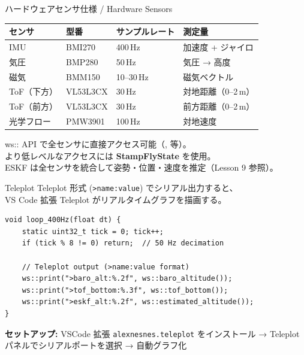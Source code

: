 
\begin{frame}{ハードウェアセンサ仕様 / Hardware Sensors}
  \vspace{0.3em}
  \centering
  {\small
  \begin{tabular}{llll}
    \hline
    \textbf{センサ} & \textbf{型番} & \textbf{サンプルレート} & \textbf{測定量} \\
    \hline
    IMU        & BMI270  & 400\,Hz  & 加速度 + ジャイロ \\
    気圧       & BMP280  & 50\,Hz   & 気圧 → 高度 \\
    磁気       & BMM150  & 10--30\,Hz & 磁気ベクトル \\
    ToF（下方） & VL53L3CX & 30\,Hz  & 対地距離（0--2\,m） \\
    ToF（前方） & VL53L3CX & 30\,Hz  & 前方距離（0--2\,m） \\
    光学フロー  & PMW3901 & 100\,Hz  & 対地速度 \\
    \hline
  \end{tabular}
  }

  \vspace{1em}

  {\footnotesize
    ws:: API で全センサに直接アクセス可能（,  等）。\\
    より低レベルなアクセスには \textbf{StampFlyState} を使用。\\
    ESKF は全センサを統合して姿勢・位置・速度を推定（Lesson 9 参照）。
  }
\end{frame}

\begin{frame}[fragile]{Teleplot}
  \vspace{0.3em}
  {\small Teleplot 形式 (\texttt{>name:value}) でシリアル出力すると、\\
  VS Code 拡張 Teleplot がリアルタイムグラフを描画する。}

  \vspace{0.3em}

  \begin{lstlisting}[style=sfcpp, basicstyle=\ttfamily\scriptsize]
void loop_400Hz(float dt) {
    static uint32_t tick = 0; tick++;
    if (tick % 8 != 0) return;  // 50 Hz decimation

    // Teleplot output (>name:value format)
    ws::print(">baro_alt:%.2f", ws::baro_altitude());
    ws::print(">tof_bottom:%.3f", ws::tof_bottom());
    ws::print(">eskf_alt:%.2f", ws::estimated_altitude());
}
  \end{lstlisting}

  \vspace{0.2em}
  {\footnotesize
    \textbf{セットアップ:} VSCode 拡張 \texttt{alexnesnes.teleplot} をインストール
    → Teleplot パネルでシリアルポートを選択 → 自動グラフ化
  }
\end{frame}


